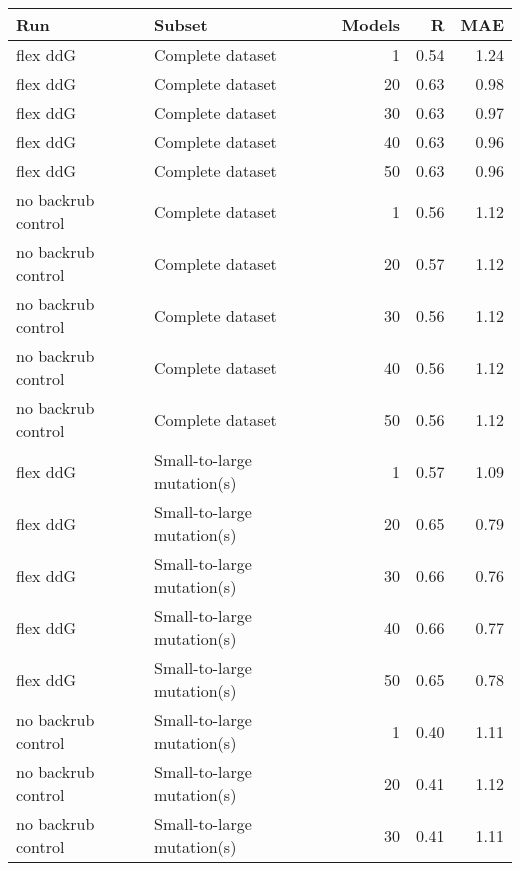 \begin{table}
\begin{tabular}{llrrr}
\toprule
                Run &                               Subset &  Models &    R &  MAE \\
\midrule
           flex ddG &                     Complete dataset &           1 & 0.54 & 1.24 \\
           flex ddG &                     Complete dataset &          20 & 0.63 & 0.98 \\
           flex ddG &                     Complete dataset &          30 & 0.63 & 0.97 \\
           flex ddG &                     Complete dataset &          40 & 0.63 & 0.96 \\
           flex ddG &                     Complete dataset &          50 & 0.63 & 0.96 \\
 no backrub control &                     Complete dataset &           1 & 0.56 & 1.12 \\
 no backrub control &                     Complete dataset &          20 & 0.57 & 1.12 \\
 no backrub control &                     Complete dataset &          30 & 0.56 & 1.12 \\
 no backrub control &                     Complete dataset &          40 & 0.56 & 1.12 \\
 no backrub control &                     Complete dataset &          50 & 0.56 & 1.12 \\
           flex ddG &           Small-to-large mutation(s) &           1 & 0.57 & 1.09 \\
           flex ddG &           Small-to-large mutation(s) &          20 & 0.65 & 0.79 \\
           flex ddG &           Small-to-large mutation(s) &          30 & 0.66 & 0.76 \\
           flex ddG &           Small-to-large mutation(s) &          40 & 0.66 & 0.77 \\
           flex ddG &           Small-to-large mutation(s) &          50 & 0.65 & 0.78 \\
 no backrub control &           Small-to-large mutation(s) &           1 & 0.40 & 1.11 \\
 no backrub control &           Small-to-large mutation(s) &          20 & 0.41 & 1.12 \\
 no backrub control &           Small-to-large mutation(s) &          30 & 0.41 & 1.11 \\

\end{tabular}
\end{table}
